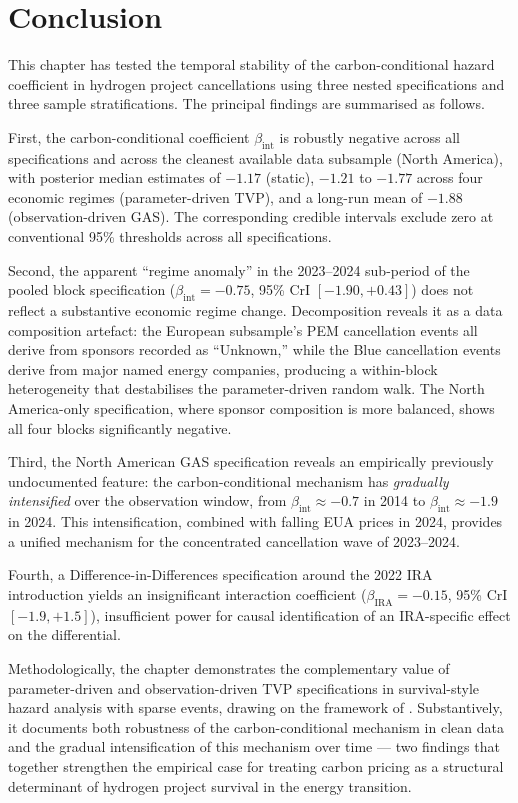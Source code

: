 \documentclass[11pt,a4paper]{article}
\newcommand{\bint}{\beta_{\mathrm{int}}}
\begin{document}
\section{Conclusion}
\label{sec:ch7-conclusion}

This chapter has tested the temporal stability of the carbon-conditional hazard coefficient in hydrogen project cancellations using three nested specifications and three sample stratifications. The principal findings are summarised as follows.

First, the carbon-conditional coefficient $\bint$ is robustly negative across all specifications and across the cleanest available data subsample (North America), with posterior median estimates of $-1.17$ (static), $-1.21$ to $-1.77$ across four economic regimes (parameter-driven TVP), and a long-run mean of $-1.88$ (observation-driven GAS). The corresponding credible intervals exclude zero at conventional 95\% thresholds across all specifications.

Second, the apparent ``regime anomaly'' in the 2023--2024 sub-period of the pooled block specification ($\bint = -0.75$, 95\% CrI $[-1.90, +0.43]$) does not reflect a substantive economic regime change. Decomposition reveals it as a data composition artefact: the European subsample's PEM cancellation events all derive from sponsors recorded as ``Unknown,'' while the Blue cancellation events derive from major named energy companies, producing a within-block heterogeneity that destabilises the parameter-driven random walk. The North America-only specification, where sponsor composition is more balanced, shows all four blocks significantly negative.

Third, the North American GAS specification reveals an empirically previously undocumented feature: the carbon-conditional mechanism has \textit{gradually intensified} over the observation window, from $\bint \approx -0.7$ in 2014 to $\bint \approx -1.9$ in 2024. This intensification, combined with falling EUA prices in 2024, provides a unified mechanism for the concentrated cancellation wave of 2023--2024.

Fourth, a Difference-in-Differences specification around the 2022 IRA introduction yields an insignificant interaction coefficient ($\beta_{\mathrm{IRA}} = -0.15$, 95\% CrI $[-1.9, +1.5]$), insufficient power for causal identification of an IRA-specific effect on the differential.

Methodologically, the chapter demonstrates the complementary value of parameter-driven and observation-driven TVP specifications in survival-style hazard analysis with sparse events, drawing on the framework of \citet{koopman2016predicting}. Substantively, it documents both robustness of the carbon-conditional mechanism in clean data and the gradual intensification of this mechanism over time --- two findings that together strengthen the empirical case for treating carbon pricing as a structural determinant of hydrogen project survival in the energy transition.
\end{document}
